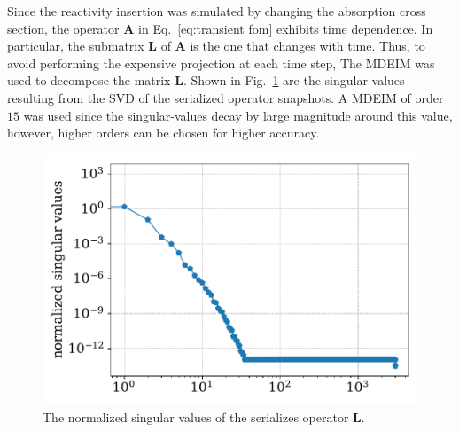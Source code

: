 \documentclass[]{interact}
\theoremstyle{plain}%
\theoremstyle{definition}
\theoremstyle{remark}
\begin{document}
Since the reactivity insertion was simulated by changing the absorption cross section, the operator $\mathbf{A}$ in Eq.~\ref{eq:transient fom} exhibits time dependence.
In particular, the submatrix $\mathbf{L}$ of $\mathbf{A}$ is the one that changes with time.
Thus, to avoid performing the expensive projection at each time step, 
The MDEIM was used to decompose the matrix $\mathbf{L}$.
Shown in Fig.~\ref{fig:lra L singular values} are the singular values resulting from the SVD of the serialized operator snapshots. 
A MDEIM of order $15$ was used since the singular-values decay by large magnitude around this value, however, higher orders can be chosen for higher accuracy.

\begin{figure}[H]
	\includegraphics[width=1.0\linewidth]{../figures/LRA_L_singular_values.pdf}
	\caption{The normalized singular values of the serializes operator $\mathbf{L}$.}
	\label{fig:lra L singular values}
\end{figure}
\end{document}
